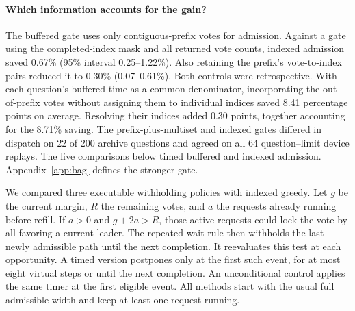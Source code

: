 \paragraph{Which information accounts for the gain?} The buffered gate uses only contiguous-prefix votes for admission. Against a gate using the completed-index mask and all returned vote counts, indexed admission saved 0.67\% (95\% interval 0.25--1.22\%). Also retaining the prefix's vote-to-index pairs reduced it to 0.30\% (0.07--0.61\%). Both controls were retrospective. With each question's buffered time as a common denominator, incorporating the out-of-prefix votes without assigning them to individual indices saved 8.41 percentage points on average. Resolving their indices added 0.30 points, together accounting for the 8.71\% saving. The prefix-plus-multiset and indexed gates differed in dispatch on 22 of 200 archive questions and agreed on all 64 question--limit device replays. The live comparisons below timed buffered and indexed admission. Appendix~\ref{app:bag} defines the stronger gate.

We compared three executable withholding policies with indexed greedy. Let \(g\) be the current margin, \(R\) the remaining votes, and \(a\) the requests already running before refill. If \(a>0\) and \(g+2a>R\), those active requests could lock the vote by all favoring a current leader. The repeated-wait rule then withholds the last newly admissible path until the next completion. It reevaluates this test at each opportunity. A timed version postpones only at the first such event, for at most eight virtual steps or until the next completion. An unconditional control applies the same timer at the first eligible event. All methods start with the usual full admissible width and keep at least one request running.

